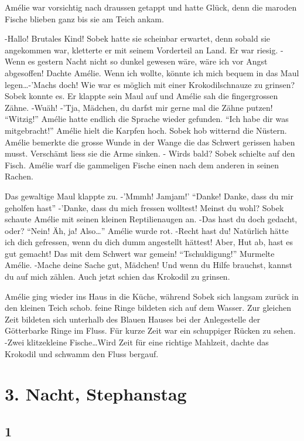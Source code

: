 \documentclass[11pt,titlepage,a5paper]{book}
\begin{document}
Amélie war vorsichtig nach draussen getappt und hatte Glück, denn die maroden Fische blieben ganz bis sie am Teich ankam.

-Hallo! Brutales Kind! Sobek hatte sie scheinbar erwartet, denn sobald sie angekommen war, kletterte er mit seinem Vorderteil an Land. Er war riesig. -Wenn es gestern Nacht nicht so dunkel gewesen wäre, wäre ich vor Angst abgesoffen! Dachte Amélie. Wenn ich wollte, könnte ich mich bequem in das Maul legen\dots -'Machs doch! Wie war es möglich mit einer Krokodilschnauze zu grinsen? Sobek konnte es. Er klappte sein Maul auf und Amélie sah die fingergrossen Zähne. -Wuäh! -'Tja, Mädchen, du darfst mir gerne mal die Zähne putzen! "`Witzig!"' Amélie hatte endlich die Sprache wieder gefunden. "`Ich habe dir was mitgebracht!"' Amélie hielt die Karpfen hoch. Sobek hob witternd die Nüstern. Amélie bemerkte die grosse Wunde in der Wange die das Schwert gerissen haben musst. Verschämt liess sie die Arme sinken. - Wirds bald? Sobek schielte auf den Fisch. Amélie warf die gammeligen Fische einen nach dem anderen in seinen Rachen.

Das gewaltige Maul klappte zu. -'Mmmh! Jamjam!' "`Danke! Danke, dass du mir geholfen hast"' -'Danke, dass du mich fressen wolltest! Meinst du wohl? Sobek schaute Amélie mit seinen kleinen Reptilienaugen an. -Das hast du doch gedacht, oder? "`Nein! Äh, ja! Also\dots"' Amélie wurde rot. -Recht hast du! Natürlich hätte ich dich gefressen, wenn du dich dumm angestellt hättest! Aber, Hut ab, hast es gut gemacht! Das mit dem Schwert war gemein! "`Tschuldigung!"' Murmelte Amélie. -Mache deine Sache gut, Mädchen! Und wenn du Hilfe brauchst, kannst du auf mich zählen. Auch jetzt schien das Krokodil zu grinsen.

Amélie ging wieder ins Haus in die Küche, während Sobek sich langsam zurück in den kleinen Teich schob. feine Ringe bildeten sich auf dem Wasser. Zur gleichen Zeit bildeten sich unterhalb des Blauen Hauses bei der Anlegestelle der Götterbarke Ringe im Fluss. Für kurze Zeit war ein schuppiger Rücken zu sehen. -Zwei klitzekleine Fische\dots Wird Zeit für eine richtige Mahlzeit, dachte das Krokodil und schwamm den Fluss bergauf. 

\chapter*{3. Nacht, Stephanstag}

\section*{1}
\end{document}
